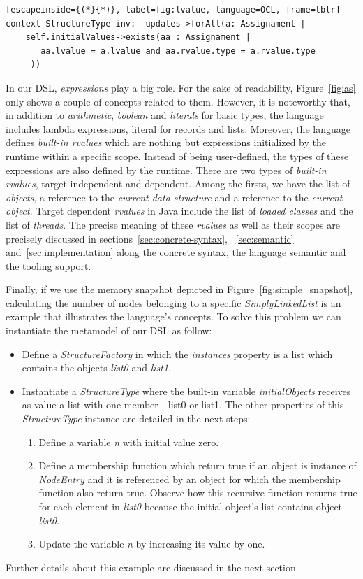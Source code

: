 \begin{lstlisting}[escapeinside={(*}{*)}, label=fig:lvalue, language=OCL, frame=tblr]
context StructureType inv:  updates->forAll(a: Assignament | 
    self.initialValues->exists(aa : Assignament | 
       aa.lvalue = a.lvalue and aa.rvalue.type = a.rvalue.type
     ))
\end{lstlisting}

In our DSL, \textit{expressions} play a big role.
For the sake of readability, Figure~\ref{fig:as} only shows a couple of concepts related to them.
However, it is noteworthy that, in addition to \textit{arithmetic}, \textit{boolean} and \textit{literals} for basic types, the language includes lambda expressions, literal for records and lists.
Moreover, the language defines \textit{built-in rvalues} which are nothing but expressions initialized by the runtime within a specific scope.
Instead of being user-defined, the types of these expressions are also defined by the runtime.
There are two types of \textit{built-in rvalues}, target independent and dependent.
Among the firsts, we have the list of  \textit{objects}, a reference to the \textit{current data structure} and a reference to the \textit{current object}.
Target dependent \textit{rvalues} in Java include the list of \textit{loaded classes} and the list of \textit{threads}.
The precise meaning of these \textit{rvalues} as well as their scopes are precisely discussed in sections~\ref{sec:concrete-syntax}, ~\ref{sec:semantic} and~\ref{sec:implementation} along the concrete syntax, the language semantic and the tooling support.

Finally, if we use the memory snapshot depicted in Figure~\ref{fig:simple_snapshot}, calculating the number of nodes belonging to a specific \textit{SimplyLinkedList} is an example that illustrates the language's concepts.
To solve this problem we can instantiate the metamodel of our DSL as follow:
\begin{itemize}
\item Define a \textit{StructureFactory} in which the \textit{instances} property is a list which contains the objects \textit{list0} and \textit{list1}.
\item Instantiate a \textit{StructureType} where the built-in variable \textit{initialObjects} receives as value a list with one member - list0 or list1.
      The other properties of this \textit{StructureType} instance are detailed in the next steps: 
      \begin{enumerate}
      \item Define a variable \textit{n} with initial value zero.
      \item Define a membership function which return true if an object is instance of \textit{NodeEntry} and it is referenced by an object for which the membership function also return true. Observe how this recursive function returns true for each element in \textit{list0} because the initial object's list contains object \textit{list0}. 
      \item Update the variable \textit{n} by increasing its value by one.
      \end{enumerate}  
\end{itemize}
Further details about this example are discussed in the next section.

